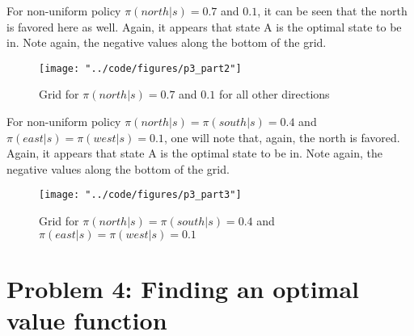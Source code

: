 \documentclass[twoside,11pt]{homework}
\DeclarePairedDelimiter{\2norm}{\lVert}{\rVert^2_2}
\newcommand{\1}[1]{\mathds{1}\left[#1\right]}
\begin{document}
For non-uniform policy $\pi(north|s) = 0.7$  and $0.1$, it can be seen that the north is favored here as well.  Again, it appears that state A is the optimal state to be in. Note again, the negative values along the bottom of the grid.

\begin{figure}[H]
\centering
\caption{Grid for $\pi(north|s) = 0.7$  and $0.1$ for all other directions}
\texttt{[image: "../code/figures/p3\_part2"]}
\label{fig:uniform-grid}
\end{figure}

For non-uniform policy $\pi(north|s) = \pi(south|s) = 0.4$  and $\pi(east|s) = \pi(west|s) = 0.1$, one will note that, again, the north is favored.  Again, it appears that state A is the optimal state to be in. Note again, the negative values along the bottom of the grid. 
\begin{figure}[H]
\centering
\caption{Grid for $\pi(north|s) = \pi(south|s) = 0.4$  and $\pi(east|s) = \pi(west|s) = 0.1$}
\texttt{[image: "../code/figures/p3\_part3"]}
\label{fig:uniform-grid}
\end{figure}





\section*{\large Problem 4: Finding an optimal value function}
\end{document}
